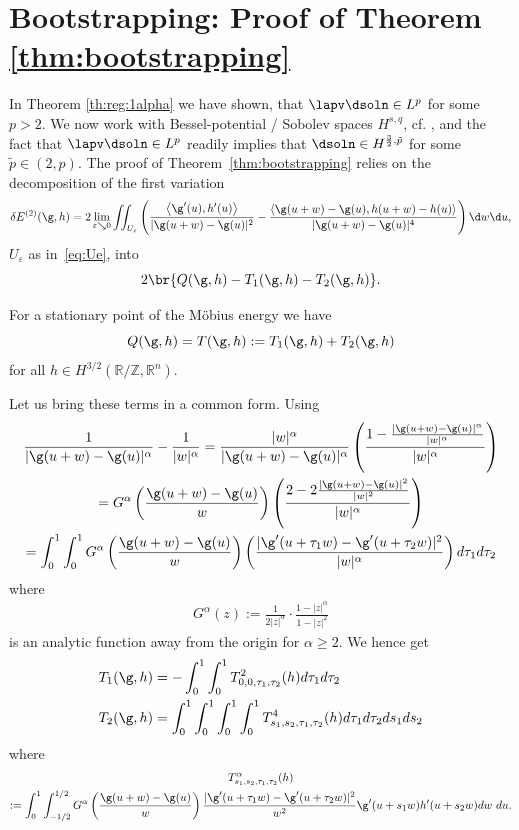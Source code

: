 \section{Bootstrapping: Proof of Theorem \ref{thm:bootstrapping}}\label{sec:bootstrapping}
In Theorem \ref{th:reg:1alpha} we have shown, that $\lapv \dsoln \in L^p$ for some $p > 2$. We now work with Bessel-potential / Sobolev spaces $H^{s,q}$, cf. \cite{RS,Tartar2007,Triebel}, and the fact that $\lapv \dsoln \in L^p$ readily implies that $\dsoln \in H^{\frac{3}{2},\tilde{p}}$ for some $\tilde{p} \in (2,p)$. The proof of Theorem~\ref{thm:bootstrapping} relies on the decomposition of the first variation
\[
 \delta E^{(2)}(\g,h) =  2\lim_{\varepsilon \searrow 0} \iint_{U_{\varepsilon}}
\left(
\frac {\left\langle \g'(u), h'(u) \right\rangle}{|\g(u+w)-\g(u)|^2}
-\frac {\left\langle \g(u+w)- \g(u), h(u+w)-h(u) \right\rangle}{|\g(u+w)-\g(u)|^4} 
\right) \d w \d u,
\]
$U_{\varepsilon}$ as in~\eqref{eq:Ue}, into 
\begin{equation*}
2\br{Q(\g,h) - T_1 (\g, h ) - T_2 (\g,h)}.
\end{equation*}

For a stationary point of the M\"obius energy we have
\begin{equation*}
 Q(\g,h)= T(\g,h):= T_1(\g,h) + T_2(\g,h)
\end{equation*}
for all $h \in H^{3/2}(\mathbb R/ \mathbb Z, \mathbb R^n)$. 

Let us bring these terms in a common form. Using
\begin{multline*}
 \frac 1 {|\g(u+w) - \g(u)|^\alpha} - \frac 1 {|w|^\alpha} 
  = \frac {|w|^\alpha}{|\g(u+w)-\g(u)|^\alpha} 
     \left(\frac {1- \frac {|\g(u+w)-\g(u)|^\alpha}{|w|^\alpha}} {|w|^\alpha} \right) \\
  = G^\alpha\left(\frac {\g(u+w)-\g(u)}{w}\right) \left(
     \frac {2-2\frac {|\g(u+w)-\g(u)|^2}{|w|^2}} {|w|^\alpha} \right) \\
  = \int_{0}^1 \int_{0}^1 G^\alpha\left(\frac {\g(u+w)-\g(u)}{w}\right) \left(
  \frac {|\g'(u+\tau_1 w) - \g'(u+\tau_2 w)|^2}{|w|^\alpha}  \right) d\tau_1 d \tau_2
\end{multline*}
where
\begin{align*}
 G^\alpha(z) := \frac 1 {2 |z|^\alpha} \cdot \frac {1- |z|^\alpha}{1 - |z|^2}
\end{align*}
is an analytic function away from the origin for $\alpha\ge 2$.
We hence get
\begin{align*}
  T_1(\g,h) &= -\int_0^1 \int_0^1 T^{2}_{0,0,\tau_1, \tau_2}(h) d\tau_1 d\tau_2 \\
 T_2(\g,h) &= \int_0^1 \int_0^1 \int_0^1 \int_0^1 T^{4}_{s_1,s_2, \tau_1, \tau_2} (h) d\tau_1 d\tau_2 ds_1 ds_2
\end{align*}
where
\begin{multline*}
 T^{\alpha}_{s_1, s_2, \tau_1, \tau_2}(h) \\:= \int_0^1 \int_{-1/2}^{1/2} G^{\alpha} 
\left(\frac {\g(u+w) - \g(u)}{w} \right) \frac {|\g'(u+\tau_1 w) -\g'(u+\tau_2 w)|^2}{w^2} 
\g'(u+s_1 w) h'(u+s_2 w) dw \ du.
\end{multline*}


